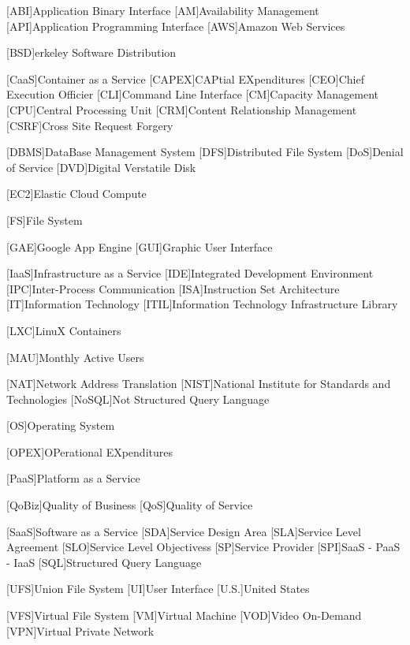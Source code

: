 %
%
[ABI]{Application Binary Interface}
[AM]{Availability Management}
[API]{Application Programming Interface}
[AWS]{Amazon Web Services}

[BSD]{erkeley Software Distribution}

[CaaS]{Container as a Service}
[CAPEX]{CAPtial EXpenditures}
[CEO]{Chief Execution Officier}
[CLI]{Command Line Interface}
[CM]{Capacity Management}
[CPU]{Central Processing Unit}
[CRM]{Content Relationship Management}
[CSRF]{Cross Site Request Forgery}

[DBMS]{DataBase Management System}
[DFS]{Distributed File System}
[DoS]{Denial of Service}
[DVD]{Digital Verstatile Disk}

[EC2]{Elastic Cloud Compute}

[FS]{File System}

[GAE]{Google App Engine}
[GUI]{Graphic User Interface}

[IaaS]{Infrastructure as a Service}
[IDE]{Integrated Development Environment}
[IPC]{Inter-Process Communication}
[ISA]{Instruction Set Architecture}
[IT]{Information Technology}
[ITIL]{Information Technology Infrastructure Library}

[LXC]{LinuX Containers}

[MAU]{Monthly Active Users}

[NAT]{Network Address Translation}
[NIST]{National Institute for Standards and Technologies}
[NoSQL]{Not Structured Query Language}

[OS]{Operating System}

[OPEX]{OPerational EXpenditures}

[PaaS]{Platform as a Service}

[QoBiz]{Quality of Business}
[QoS]{Quality of Service}

[SaaS]{Software as a Service}
[SDA]{Service Design Area}
[SLA]{Service Level Agreement}
[SLO]{Service Level Objectivess}
[SP]{Service Provider}
[SPI]{SaaS - PaaS - IaaS}
[SQL]{Structured Query Language}

[UFS]{Union File System}
[UI]{User Interface}
[U.S.]{United States}

[VFS]{Virtual File System}
[VM]{Virtual Machine}
[VOD]{Video On-Demand}
[VPN]{Virtual Private Network}